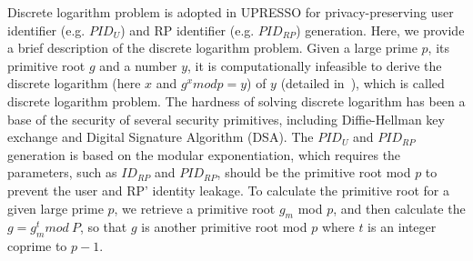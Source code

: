 Discrete logarithm problem is adopted in UPRESSO for privacy-preserving user identifier (e.g. $PID_U$) and RP identifier (e.g. $PID_{RP}$) generation.
Here, we provide a brief description of the discrete logarithm problem.
Given a large prime $p$, its primitive root $g$ and a number $y$, it is computationally infeasible to derive the discrete logarithm (here $x$ and $g^xmodp=y$) of $y$ (detailed in~\cite{WXWM}), which is called discrete logarithm problem.
The hardness of solving discrete logarithm has been a base of the security of several security primitives, including Diffie-Hellman key exchange and Digital Signature Algorithm (DSA).
The $PID_U$ and $PID_{RP}$ generation is based on the modular exponentiation, which requires the parameters, such as $ID_{RP}$ and $PID_{RP}$, should be the primitive root mod $p$ to prevent the user and RP' identity leakage.
To calculate the primitive root for a given large prime $p$, we retrieve a primitive root $g_m$ mod $p$, and then calculate the $g = g_{m}^{t} mod \ P$, so that $g$ is another primitive root mod $p$ where $t$ is an integer coprime to $p-1$.

